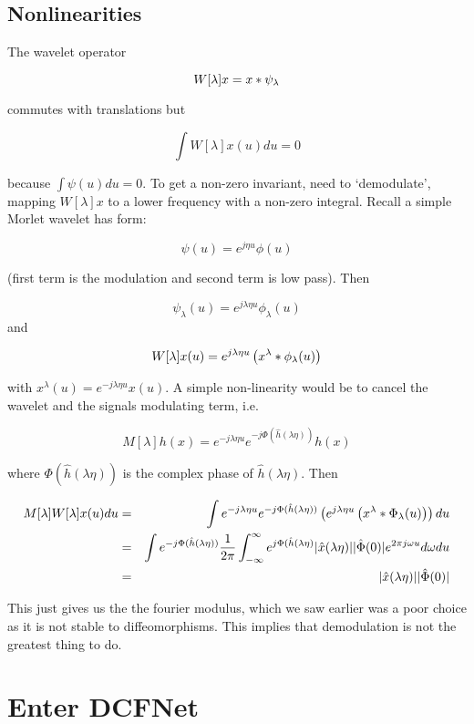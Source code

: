 \subsection{Nonlinearities}
The wavelet operator 

$$ W[\lambda] x = x \ast \psi_\lambda $$

commutes with translations but

$$ \int W[\lambda] x(u) du = 0 $$

because $\int \psi(u) du = 0$. To get a non-zero invariant, need to
`demodulate', mapping $W[\lambda]x$ to a lower frequency with a 
non-zero integral. Recall a simple Morlet wavelet has form:

$$ \psi(u) = e^{j \eta u} \phi(u) $$

(first term is the modulation and second term is low pass). Then 

$$ \psi_{\lambda}(u) = e^{j\lambda \eta u} \phi_\lambda (u) $$
and

$$ W[\lambda] x(u) =  e^{j\lambda \eta u} \left( x^{\lambda} \ast \phi_\lambda (u) \right) $$

with $x^\lambda (u) = e^{-j\lambda \eta u} x(u)$. A simple non-linearity would
be to cancel the wavelet and the signals modulating term, i.e.

$$  M[\lambda] h(x)  = e^{-j\lambda \eta u} e^{-j\Phi( \hat{h}(\lambda \eta))} h(x) $$

where $\Phi (\hat{h} (\lambda \eta ))$ is the complex phase of 
$\hat{h}(\lambda \eta)$. Then 

\begin{eqnarray*}
  M[\lambda]W[\lambda] x(u) du & = & 
    \int e^{-j\lambda \eta u} e^{-j \Phi(\hat{h}(\lambda \eta))} 
    \left( e^{j\lambda \eta u} \left( x^{\lambda} \ast \Phi_\lambda (u) \right) \right) du \\
    & = & \int e^{-j \Phi(\hat{h}(\lambda \eta))} \frac{1}{2\pi}
    \int_{-\infty}^{\infty} e^{j\Phi(\hat{h}(\lambda \eta)} 
      |\hat{x} (\lambda \eta)| |\hat{\Phi}(0)| e^{2\pi j \omega u} d\omega du \\
    & = &  |\hat{x} (\lambda \eta)| |\hat{\Phi}(0)| 
\end{eqnarray*}

This just gives us the the fourier modulus, which we saw earlier was a poor
choice as it is not stable to diffeomorphisms. This implies that demodulation is
not the greatest thing to do.

\section{Enter DCFNet}

